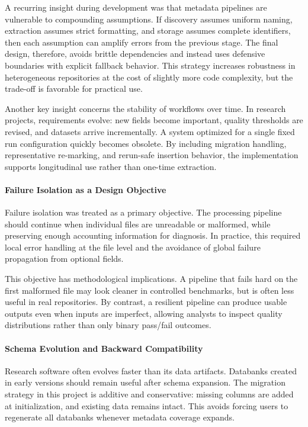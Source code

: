 A recurring insight during development was that metadata pipelines are vulnerable to compounding assumptions. If discovery assumes uniform naming, extraction assumes strict formatting, and storage assumes complete identifiers, then each assumption can amplify errors from the previous stage. The final design, therefore, avoids brittle dependencies and instead uses defensive boundaries with explicit fallback behavior. This strategy increases robustness in heterogeneous repositories at the cost of slightly more code complexity, but the trade-off is favorable for practical use.

Another key insight concerns the stability of workflows over time. In research projects, requirements evolve: new fields become important, quality thresholds are revised, and datasets arrive incrementally. A system optimized for a single fixed run configuration quickly becomes obsolete. By including migration handling, representative re-marking, and rerun-safe insertion behavior, the implementation supports longitudinal use rather than one-time extraction.

\paragraph{Failure Isolation as a Design Objective}
Failure isolation was treated as a primary objective. The processing pipeline should continue when individual files are unreadable or malformed, while preserving enough accounting information for diagnosis. In practice, this required local error handling at the file level and the avoidance of global failure propagation from optional fields.

This objective has methodological implications. A pipeline that fails hard on the first malformed file may look cleaner in controlled benchmarks, but is often less useful in real repositories. By contrast, a resilient pipeline can produce usable outputs even when inputs are imperfect, allowing analysts to inspect quality distributions rather than only binary pass/fail outcomes.

\paragraph{Schema Evolution and Backward Compatibility}
Research software often evolves faster than its data artifacts. Databanks created in early versions should remain useful after schema expansion. The migration strategy in this project is additive and conservative: missing columns are added at initialization, and existing data remains intact. This avoids forcing users to regenerate all databanks whenever metadata coverage expands.

